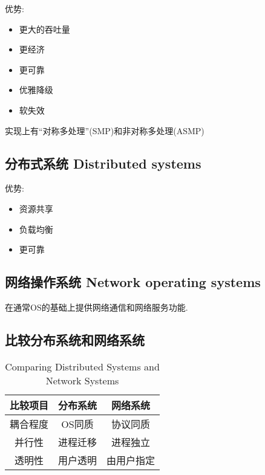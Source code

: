         优势:
        \begin{itemize}
            \item 更大的吞吐量
            \item 更经济
            \item 更可靠
            \item 优雅降级
            \item 软失效
        \end{itemize}

        实现上有``对称多处理''(SMP)和非对称多处理(ASMP)

    \subsection{分布式系统 Distributed systems}

        优势:
        \begin{itemize}
            \item 资源共享
            \item 负载均衡
            \item 更可靠
        \end{itemize}

    \subsection{网络操作系统 Network operating systems}

        在通常OS的基础上提供网络通信和网络服务功能.

    \subsection{比较分布系统和网络系统}

        \begin{table}[h]\centering
            \caption{Comparing Distributed Systems and Network Systems}
            \label{tab:2:comparing-distributed-network}
            \begin{tabular}{ccc}\toprule
                比较项目 & \bf 分布系统 & \bf 网络系统 \\ \midrule
                耦合程度 & OS同质 & 协议同质 \\
                并行性 & 进程迁移 & 进程独立 \\
                透明性 & 用户透明 & 由用户指定 \\
                \bottomrule
            \end{tabular}
        \end{table}

